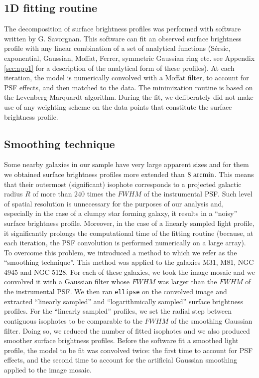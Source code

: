 \documentclass[preprint2]{emulateapj}
\begin{document}
\subsection{1D fitting routine}
The decomposition of surface brightness profiles was performed with software written by G. Savorgnan.
This software can fit an observed surface brightness profile with any linear combination of 
a set of analytical functions (S\'ersic, exponential, Gaussian, Moffat, Ferrer, symmetric Gaussian ring etc. 
see Appendix \ref{sec:app1} for a description of the analytical form of these profiles).
At each iteration, 
the model is numerically convolved with a Moffat filter, to account for PSF effects, 
and then matched to the data.
The minimization routine is based on the Levenberg-Marquardt algorithm.
During the fit, we deliberately did not make use of any weighting scheme on the data points that constitute the 
surface brightness profile. 

\subsection{Smoothing technique}
\label{sec:smooth}
Some nearby galaxies in our sample have very large apparent sizes 
and for them we obtained surface brightness profiles more extended than $8~\rm arcmin$.
This means that their outermost (significant) isophote 
corresponds to a projected galactic radius $R$ 
of more than $240$ times the $FWHM$ of the instrumental PSF.
Such level of spatial resolution is unnecessary for the purposes of our analysis 
and, especially in the case of a clumpy star forming galaxy, 
it results in a ``noisy'' surface brightness profile.
Moreover, in the case of a linearly sampled light profile,
it significantly prolongs the computational time of the fitting routine 
(because, at each iteration, the PSF convolution is performed numerically on a large array).
To overcome this problem, we introduced a method to which we refer as the ``smoothing technique''.
This method was applied to the galaxies M31, M81, NGC 4945 and NGC 5128.
For each of these galaxies, we took the image mosaic and we convolved it with a Gaussian filter 
whose $FWHM$ was larger than the $FWHM$ of the instrumental PSF.
We then ran {\tt ellipse} on the convolved image and extracted 
``linearly sampled'' and ``logarithmically sampled'' surface brightness profiles. 
For the ``linearly sampled'' profiles, we set the radial step between contiguous isophotes to be 
comparable to the $FWHM$ of the smoothing Gaussian filter.
Doing so, we reduced the number of fitted isophotes and we also produced smoother surface brightness profiles.
Before the software fit a smoothed light profile, the model to be fit was convolved twice:
the first time to account for PSF effects, 
and the second time to account for the artificial Gaussian smoothing applied to the image mosaic.
\end{document}
